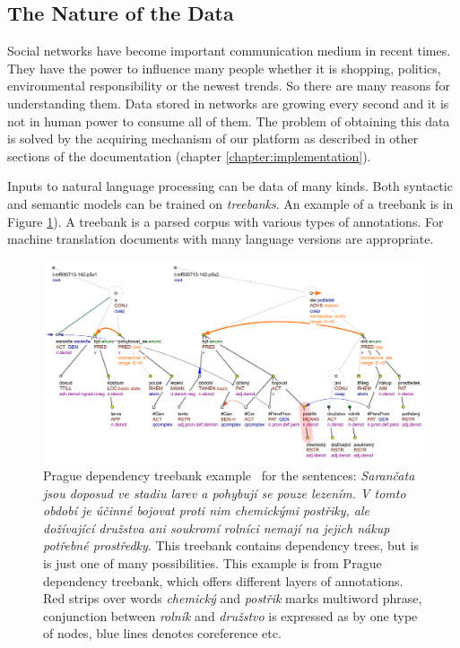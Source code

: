 \subsection{The Nature of the Data}
 Social networks have become important communication medium in recent times. They have the power to influence many people whether it is shopping, politics, environmental responsibility or the newest trends. So there are many reasons for understanding them. Data stored in networks are growing every second and it is not in human power to consume all of them. The problem of obtaining this data is solved by the acquiring mechanism of our platform as described in other sections of the documentation (chapter \ref{chapter:implementation}).
 \par
 Inputs to natural language processing can be data of many kinds. Both syntactic and semantic models can be trained on \textit{treebanks}. An example of a treebank is in Figure \ref{fig:pdt}). A treebank is a parsed corpus with various types of annotations.
For machine translation documents with many language versions are appropriate.

\begin{figure}
\centering
\includegraphics[width=1\textwidth]{diagrams/prague_dep_treebank.png}
\caption{
Prague dependency treebank example~\cite{PDT35} for the sentences: \textit{Sarančata jsou doposud ve stadiu larev a pohybují se pouze lezením. V tomto období je účinné bojovat proti nim chemickými postřiky, ale dožívající družstva ani soukromí rolníci nemají na jejich nákup potřebné prostředky}. This treebank contains dependency trees, but is is just one of many possibilities. This example is from Prague dependency treebank, which offers different layers of annotations. Red strips over words \textit{chemický} and \textit{postřik} marks multiword phrase, conjunction between \textit{rolník} and \textit{družstvo} is expressed as by one type of nodes, blue lines denotes coreference etc.}
\label{fig:pdt}
\end{figure}

